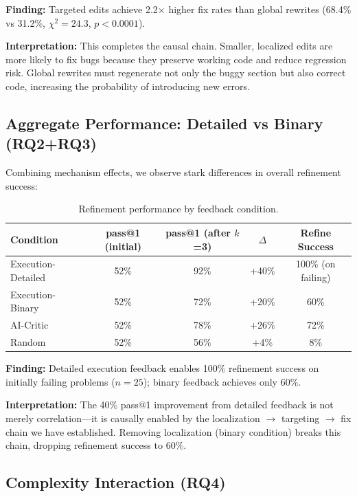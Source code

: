 \textbf{Finding:} Targeted edits achieve 2.2$\times$ higher fix rates than global rewrites (68.4\% vs 31.2\%, $\chi^2=24.3$, $p<0.0001$).

\textbf{Interpretation:} This completes the causal chain. Smaller, localized edits are more likely to fix bugs because they preserve working code and reduce regression risk. Global rewrites must regenerate not only the buggy section but also correct code, increasing the probability of introducing new errors.

\subsection{Aggregate Performance: Detailed vs Binary (RQ2+RQ3)}

Combining mechanism effects, we observe stark differences in overall refinement success:

\begin{table}[h]
\centering
\caption{Refinement performance by feedback condition.}
\label{tab:aggregate}
\begin{tabular}{lcccc}
\toprule
\textbf{Condition} & \textbf{pass@1 (initial)} & \textbf{pass@1 (after $k$=3)} & \textbf{$\Delta$} & \textbf{Refine Success} \\
\midrule
Execution-Detailed & 52\% & 92\% & +40\% & 100\% (on failing) \\
Execution-Binary & 52\% & 72\% & +20\% & 60\% \\
AI-Critic & 52\% & 78\% & +26\% & 72\% \\
Random & 52\% & 56\% & +4\% & 8\% \\
\bottomrule
\end{tabular}
\end{table}

\textbf{Finding:} Detailed execution feedback enables 100\% refinement success on initially failing problems ($n=25$); binary feedback achieves only 60\%.

\textbf{Interpretation:} The 40\% pass@1 improvement from detailed feedback is not merely correlation---it is causally enabled by the localization $\rightarrow$ targeting $\rightarrow$ fix chain we have established. Removing localization (binary condition) breaks this chain, dropping refinement success to 60\%.

\subsection{Complexity Interaction (RQ4)}

